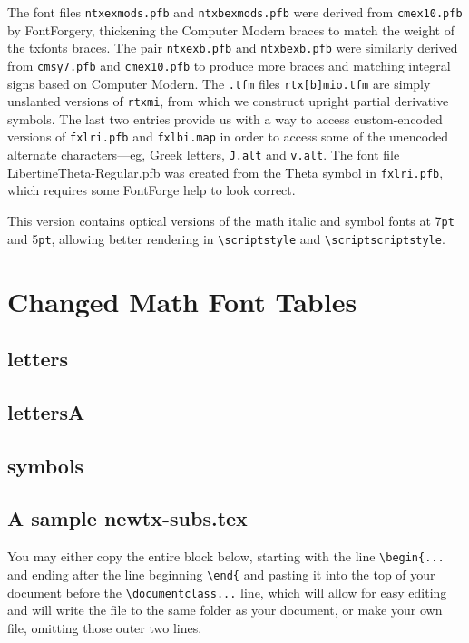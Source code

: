 \documentclass[\fsc]{article}
\theoremstyle{oldplain}
\theoremstyle{plain}
\begin{document}
The font files {\tt ntxexmods.pfb} and {\tt ntxbexmods.pfb} were derived from {\tt cmex10.pfb} by FontForgery, thickening the Computer Modern braces to match the weight of the \textsf{txfonts} braces. The pair {\tt ntxexb.pfb} and {\tt ntxbexb.pfb} were similarly derived from {\tt cmsy7.pfb} and {\tt cmex10.pfb} to produce more braces and matching integral signs based on Computer Modern. The {\tt.tfm} files {\tt rtx[b]mio.tfm} are simply unslanted versions of {\tt rtxmi}, from which we construct upright partial derivative symbols.
The last two entries provide us with a way to access custom-encoded versions of {\tt fxlri.pfb} and {\tt fxlbi.map} in order to access some of the unencoded alternate characters---eg, Greek letters, {\tt J.alt} and {\tt v.alt}. The font file \textsf{LibertineTheta-Regular.pfb} was created from the Theta symbol in {\tt fxlri.pfb}, which requires some FontForge help to look correct.

This version contains optical versions of the math italic and symbol fonts at 7\texttt{pt} and 5\texttt{pt}, allowing better rendering in \verb|\scriptstyle| and \verb|\scriptscriptstyle|. 
\section{Changed Math Font Tables}
\subsection{letters}
\newpage  
\subsection{lettersA}
\newpage  
\subsection{symbols}
 
\subsection{A sample newtx-subs.tex}
You may either copy the entire block below, starting with the line \verb|\begin{...| and ending after the line beginning \verb|\end{|
and pasting it into the top of your document before the \verb|\documentclass...| line, which will allow for easy editing and will write the file to the same folder as your document, or make your own file, omitting those outer two lines.
\end{document}
